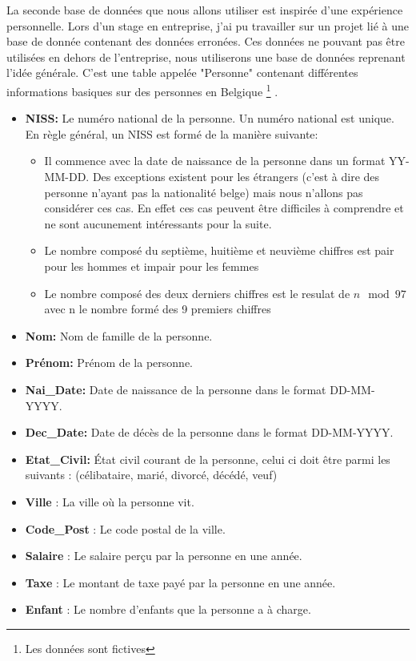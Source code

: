 \documentclass[letterpaper, 12pt]{report}
\theoremstyle{definition}
\begin{document}
La seconde base de données que nous allons utiliser est inspirée d'une expérience personnelle. Lors d'un stage en entreprise, j'ai pu travailler sur un projet lié à une base de donnée contenant des données erronées. Ces données ne pouvant pas être utilisées en dehors de l'entreprise, nous utiliserons une base de données reprenant l'idée générale. C'est une table appelée "Personne" contenant différentes informations basiques sur des personnes en Belgique \footnote{Les données sont fictives} . 

\begin{itemize}
\item \textbf{NISS:} Le numéro national de la personne. Un numéro national est unique. En règle général, un NISS est formé de la manière suivante: \cite{bcss}
	\begin{itemize}
	\item Il commence avec la date de naissance de la personne dans un format YY-MM-DD. Des exceptions existent pour les étrangers (c'est à dire des personne n'ayant pas la nationalité belge) mais nous n'allons pas considérer ces cas. En effet ces cas peuvent être difficiles à comprendre et ne sont aucunement intéressants pour la suite.
	\item Le nombre composé du septième, huitième et neuvième chiffres est pair pour les hommes et impair pour les femmes
	\item Le nombre composé des deux derniers chiffres est le resulat de $n \mod 97$ avec n le nombre formé des 9 premiers chiffres
	\end{itemize}
\item \textbf{Nom:} Nom de famille de la personne.
\item \textbf{Prénom:} Prénom de la personne.
\item \textbf{Nai\_Date:} Date de naissance de la personne dans le format DD-MM-YYYY.
\item \textbf{Dec\_Date:} Date de décès de la personne dans le format DD-MM-YYYY.
\item \textbf{Etat\_Civil:} État civil courant de la personne, celui ci doit être parmi les suivants : (célibataire, marié, divorcé, décédé, veuf)
\item \textbf{Ville} : La ville où la personne vit.
\item \textbf{Code\_Post} : Le code postal de la ville.
\item \textbf{Salaire} : Le salaire perçu par la personne en une année.
\item \textbf{Taxe} : Le montant de taxe payé par la personne en une année.
\item \textbf{Enfant} : Le nombre d'enfants que la personne a à charge.
\end{itemize}
\end{document}
